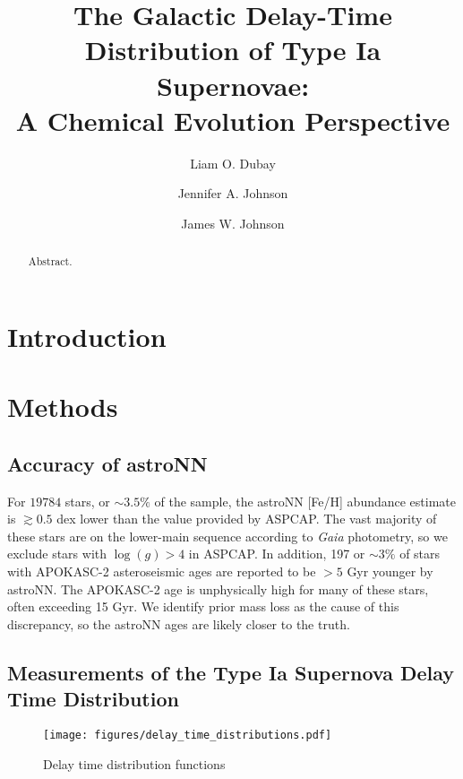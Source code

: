 \documentclass[twocolumn]{aastex631}
\begin{document}
\title{The Galactic Delay-Time Distribution of Type Ia Supernovae:\\
    A Chemical Evolution Perspective}

\author[0000-0003-3781-0747]{Liam O. Dubay}
\author[0000-0001-7258-1834]{Jennifer A. Johnson}
\author[0000-0002-6534-8783]{James W. Johnson}

\begin{abstract}
    Abstract.
\end{abstract}

\section{Introduction}

\section{Methods}
\label{sec:methods}

\subsection{Accuracy of astroNN}
\label{subsec:astronn-quality}

For $19784$ stars, or $\sim3.5\%$ of the sample, the astroNN [Fe/H] abundance estimate is $\gtrsim0.5$ dex lower than the value provided by ASPCAP. The vast majority of these stars are on the lower-main sequence according to \textit{Gaia} photometry, so we exclude stars with $\log(g) > 4$ in ASPCAP. In addition, 197 or $\sim3\%$ of stars with APOKASC-2 asteroseismic ages are reported to be $>5$ Gyr younger by astroNN. The APOKASC-2 age is unphysically high for many of these stars, often exceeding 15 Gyr. We identify prior mass loss as the cause of this discrepancy, so the astroNN ages are likely closer to the truth.

\subsection{Measurements of the Type Ia Supernova Delay Time Distribution}
\label{subsec:dtd-measurements}

\begin{figure}
    \centering
    \texttt{[image: figures/delay\_time\_distributions.pdf]}
    \caption{Delay time distribution functions}
    \label{fig:dtds}
\end{figure}
\end{document}
